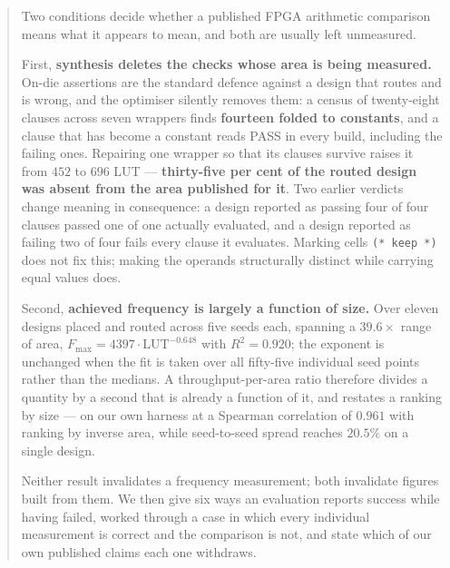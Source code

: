 \documentclass[11pt]{article}
\date{22 September 2026}
\begin{document}
\maketitle

\begin{abstract}
Two conditions decide whether a published FPGA arithmetic comparison means what
it appears to mean, and both are usually left unmeasured.

First, \textbf{synthesis deletes the checks whose area is being measured.}
On-die assertions are the standard defence against a design that routes and is
wrong, and the optimiser silently removes them: a census of twenty-eight clauses
across seven wrappers finds \textbf{fourteen folded to constants}, and a clause
that has become a constant reads PASS in every build, including the failing
ones. Repairing one wrapper so that its clauses survive raises it from $452$ to
$696$ LUT --- \textbf{thirty-five per cent of the routed design was absent from
the area published for it}. Two earlier verdicts change meaning in consequence:
a design reported as passing four of four clauses passed one of one actually
evaluated, and a design reported as failing two of four fails every clause it
evaluates. Marking cells \texttt{(* keep *)} does not fix this; making the
operands structurally distinct while carrying equal values does.

Second, \textbf{achieved frequency is largely a function of size.} Over eleven
designs placed and routed across five seeds each, spanning a $39.6\times$ range
of area, $F_{\max}=4397\cdot\mathrm{LUT}^{-0.648}$ with $R^{2}=0.920$; the
exponent is unchanged when the fit is taken over all fifty-five individual seed
points rather than the medians. A throughput-per-area ratio therefore divides a
quantity by a second that is already a function of it, and restates a ranking by
size --- on our own harness at a Spearman correlation of $0.961$ with ranking by
inverse area, while seed-to-seed spread reaches $20.5\%$ on a single design.

Neither result invalidates a frequency measurement; both invalidate figures
built from them. We then give six ways an evaluation reports success while
having failed, worked through a case in which every individual measurement is
correct and the comparison is not, and state which of our own published claims
each one withdraws.
\end{abstract}

\tableofcontents
\newpage






\end{document}
